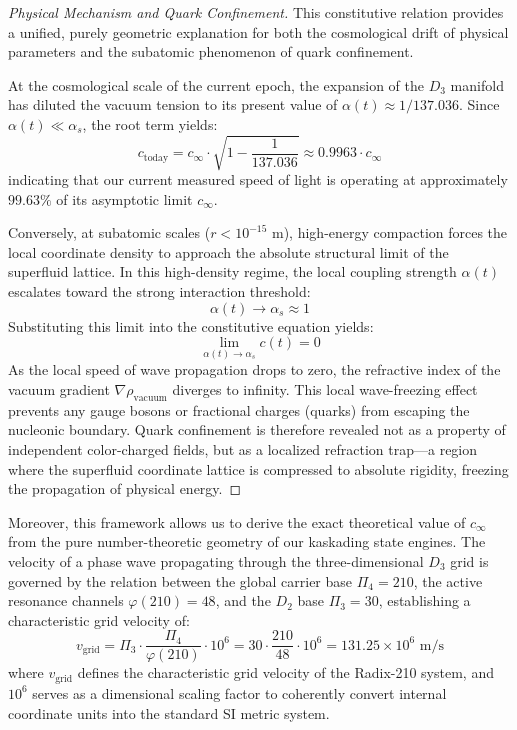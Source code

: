 \documentclass[11pt,a4paper]{article}
\theoremstyle{plain}
\theoremstyle{definition}
\theoremstyle{remark}
\begin{document}
\begin{proof}[Physical Mechanism and Quark Confinement]
This constitutive relation provides a unified, purely geometric explanation for both the cosmological drift of physical parameters and the subatomic phenomenon of quark confinement.

At the cosmological scale of the current epoch, the expansion of the $D_3$ manifold has diluted the vacuum tension to its present value of $\alpha(t) \approx 1/137.036$. Since $\alpha(t) \ll \alpha_s$, the root term yields:
\begin{equation}
c_{\text{today}} = c_{\infty} \cdot \sqrt{1 - \frac{1}{137.036}} \approx 0.9963 \cdot c_{\infty}
\end{equation}
indicating that our current measured speed of light is operating at approximately $99.63\%$ of its asymptotic limit $c_{\infty}$.

Conversely, at subatomic scales ($r < 10^{-15}\text{ m}$), high-energy compaction forces the local coordinate density to approach the absolute structural limit of the superfluid lattice. In this high-density regime, the local coupling strength $\alpha(t)$ escalates toward the strong interaction threshold:
\begin{equation}
\alpha(t) \to \alpha_s \approx 1
\end{equation}
Substituting this limit into the constitutive equation yields:
\begin{equation}
\lim_{\alpha(t) \to \alpha_s} c(t) = 0
\end{equation}
As the local speed of wave propagation drops to zero, the refractive index of the vacuum gradient $\nabla \rho_{\text{vacuum}}$ diverges to infinity. This local wave-freezing effect prevents any gauge bosons or fractional charges (quarks) from escaping the nucleonic boundary. Quark confinement is therefore revealed not as a property of independent color-charged fields, but as a localized refraction trap—a region where the superfluid coordinate lattice is compressed to absolute rigidity, freezing the propagation of physical energy.
\end{proof}

Moreover, this framework allows us to derive the exact theoretical value of $c_{\infty}$ from the pure number-theoretic geometry of our kaskading state engines. The velocity of a phase wave propagating through the three-dimensional $D_3$ grid is governed by the relation between the global carrier base $\Pi_4 = 210$, the active resonance channels $\varphi(210) = 48$, and the $D_2$ base $\Pi_3 = 30$, establishing a characteristic grid velocity of:
\begin{equation}
v_{\text{grid}} = \Pi_3 \cdot \frac{\Pi_4}{\varphi(210)} \cdot 10^6 = 30 \cdot \frac{210}{48} \cdot 10^6 = 131.25 \times 10^6 \text{ m/s}
\end{equation}
where $v_{\text{grid}}$ defines the characteristic grid velocity of the Radix-210 system, and $10^6$ serves as a dimensional scaling factor to coherently convert internal coordinate units into the standard SI metric system.
\end{document}
